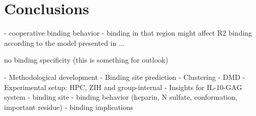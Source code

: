 \chapter{Conclusions}


- cooperative binding behavior
- binding in that region might affect R2 binding according to the model
    presented in ...

    no binding specificity (this is something for outlook)


    - Methodological development
        - Binding site prediction
        - Clustering
        - DMD
        - Experimental setup: HPC, ZIH and group-internal
    - Insights for IL-10-GAG system
        - binding site
        - binding behavior (heparin, N sulfate, conformation, important residue)
        - binding implications